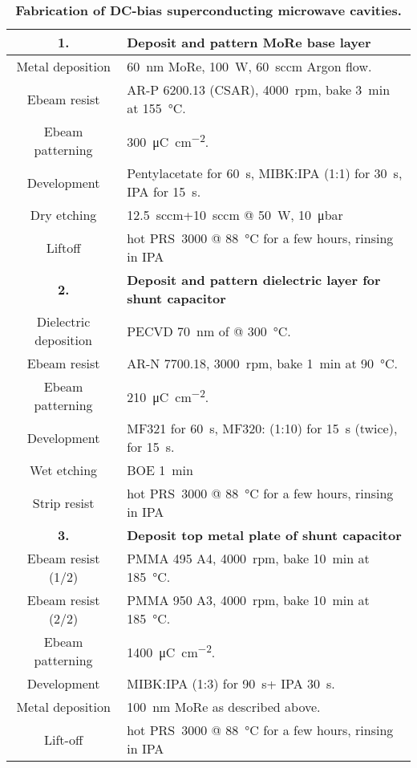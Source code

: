 \begin{table}[h]
	\caption{
		\textbf{Fabrication of DC-bias superconducting microwave cavities.}
	}
	\label{tab:fabRF}
\begin{tabularx}{\textwidth}{@{}cY@{}}
	\hline \hline
	\textbf{1.} & \textbf{Deposit and pattern MoRe base layer} \\
	\hline 
	Metal deposition & \SI{60}{\nano\meter} MoRe, \SI{100}{\watt}, \SI{60}{sccm} Argon flow. \\
	Ebeam resist & AR-P 6200.13 (CSAR), \SI{4000}{rpm}, bake \SI{3}{\minute} at \SI{155}{\celsius}. \\
	Ebeam patterning & \SI{300}{\micro\coulomb\per\centi\meter\squared}. \\
	Development & Pentylacetate for \SI{60}{\second}, MIBK:IPA (1:1) for \SI{30}{\second}, IPA for \SI{15}{\second}. \\
	Dry etching &  \SI{12.5}{sccm}+\SI{10}{sccm} @ \SI{50}{\watt}, \SI{10}{\micro\bar} \\
	Liftoff & hot PRS~3000 @ \SI{88}{\celsius} for a few hours, rinsing in IPA \\
	\hline
	
	\textbf{2.} & \textbf{Deposit and pattern dielectric layer for shunt capacitor} \\
	\hline 
	Dielectric deposition & PECVD \SI{70}{\nano\meter} of  @ \SI{300}{\celsius}. \\
	Ebeam resist & AR-N 7700.18, \SI{3000}{rpm}, bake \SI{1}{\minute} at \SI{90}{\celsius}. \\
	Ebeam patterning & \SI{210}{\micro\coulomb\per\centi\meter\squared}. \\
	Development & MF321 for \SI{60}{\second}, MF320: (1:10) for \SI{15}{\second} (twice),  for \SI{15}{\second}. \\
	Wet etching & BOE \SI{1}{\minute} \\
	Strip resist & hot PRS~3000 @ \SI{88}{\celsius} for a few hours, rinsing in IPA \\
	\hline
	
	\textbf{3.} & \textbf{Deposit top metal plate of shunt capacitor} \\
	\hline 
	Ebeam resist (1/2) & PMMA 495 A4, \SI{4000}{rpm}, bake \SI{10}{\minute} at \SI{185}{\celsius}. \\
	Ebeam resist (2/2) & PMMA 950 A3, \SI{4000}{rpm}, bake \SI{10}{\minute} at \SI{185}{\celsius}. \\
	Ebeam patterning & \SI{1400}{\micro\coulomb\per\centi\meter\squared}. \\
	Development & MIBK:IPA (1:3) for \SI{90}{\second}+ IPA \SI{30}{\second}. \\
	Metal deposition & \SI{100}{\nano\meter} MoRe as described above. \\
	Lift-off & hot PRS~3000 @ \SI{88}{\celsius} for a few hours, rinsing in IPA \\
	\hline\hline
\end{tabularx}
\end{table}

